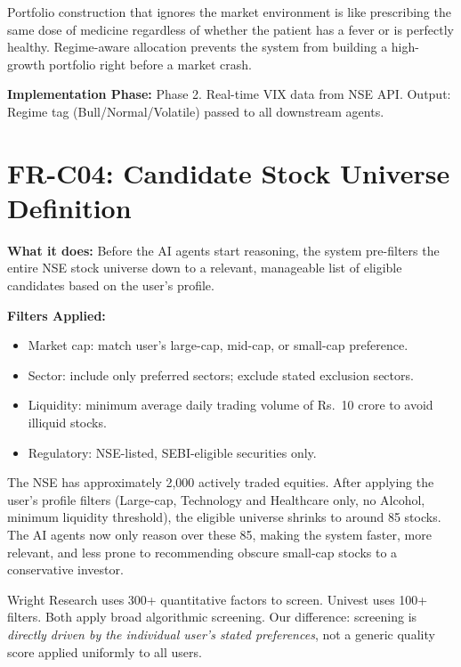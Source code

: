 \documentclass[12pt, a4paper, openany, oneside]{report}
\newcommand{\rupee}{Rs.~}
\begin{document}
\begin{valuebox}
Portfolio construction that ignores the market environment is like prescribing the same dose of medicine regardless of whether the patient has a fever or is perfectly healthy. Regime-aware allocation prevents the system from building a high-growth portfolio right before a market crash.
\end{valuebox}

\textbf{Implementation Phase:} Phase 2. Real-time VIX data from NSE API. Output: Regime tag (Bull/Normal/Volatile) passed to all downstream agents.

\section{FR-C04: Candidate Stock Universe Definition}

\textbf{What it does:} Before the AI agents start reasoning, the system pre-filters the entire NSE stock universe down to a relevant, manageable list of eligible candidates based on the user's profile.

\textbf{Filters Applied:}
\begin{itemize}
  \item Market cap: match user's large-cap, mid-cap, or small-cap preference.
  \item Sector: include only preferred sectors; exclude stated exclusion sectors.
  \item Liquidity: minimum average daily trading volume of \rupee10 crore to avoid illiquid stocks.
  \item Regulatory: NSE-listed, SEBI-eligible securities only.
\end{itemize}

\begin{examplebox}
The NSE has approximately 2,000 actively traded equities. After applying the user's profile filters (Large-cap, Technology and Healthcare only, no Alcohol, minimum liquidity threshold), the eligible universe shrinks to around 85 stocks. The AI agents now only reason over these 85, making the system faster, more relevant, and less prone to recommending obscure small-cap stocks to a conservative investor.
\end{examplebox}

\begin{gapbox}
Wright Research uses 300+ quantitative factors to screen. Univest uses 100+ filters. Both apply broad algorithmic screening. Our difference: screening is \textit{directly driven by the individual user's stated preferences}, not a generic quality score applied uniformly to all users.
\end{gapbox}
\end{document}
